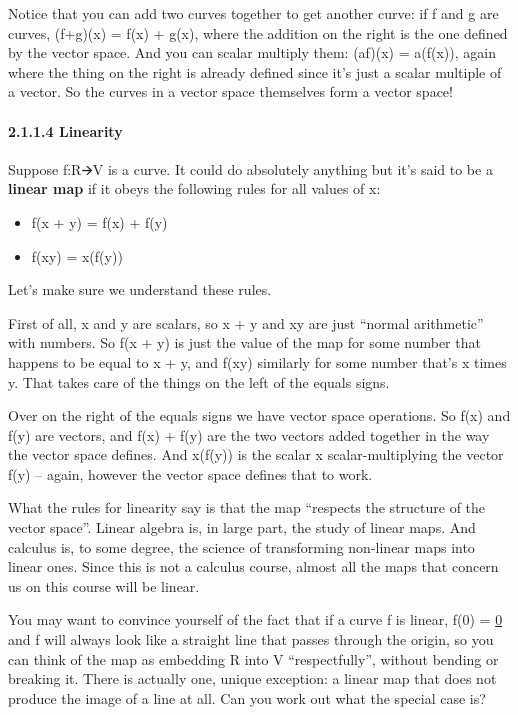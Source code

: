 \documentclass[oneside,english]{amsbook}
\numberwithin{section}{chapter}
\theoremstyle{plain}
\theoremstyle{definition}
\begin{document}
Notice that you can add two curves together to get another curve: if f
and g are curves, (f+g)(x) = f(x) + g(x), where the addition on the
right is the one defined by the vector space. And you can scalar
multiply them: (af)(x) = a(f(x)), again where the thing on the right is
already defined since it's just a scalar multiple of a vector. So the
curves in a vector space themselves form a vector space!

\paragraph{2.1.1.4 Linearity}\label{linearity}

Suppose f:R🡪V is a curve. It could do absolutely anything but it's said
to be a \textbf{linear map} if it obeys the following rules for all
values of x:

\begin{itemize}
	\item
	f(x + y) = f(x) + f(y)
	\item
	f(xy) = x(f(y))
\end{itemize}

Let's make sure we understand these rules.

First of all, x and y are scalars, so x + y and xy are just ``normal
arithmetic'' with numbers. So f(x + y) is just the value of the map for
some number that happens to be equal to x + y, and f(xy) similarly for
some number that's x times y. That takes care of the things on the left
of the equals signs.

Over on the right of the equals signs we have vector space operations.
So f(x) and f(y) are vectors, and f(x) + f(y) are the two vectors added
together in the way the vector space defines. And x(f(y)) is the scalar
x scalar-multiplying the vector f(y) -- again, however the vector space
defines that to work.

What the rules for linearity say is that the map ``respects the
structure of the vector space''. Linear algebra is, in large part, the
study of linear maps. And calculus is, to some degree, the science of
transforming non-linear maps into linear ones. Since this is not a
calculus course, almost all the maps that concern us on this course will
be linear.

You may want to convince yourself of the fact that if a curve f is
linear, f(0) = \ul{0} and f will always look like a straight line that
passes through the origin, so you can think of the map as embedding R
into V ``respectfully'', without bending or breaking it. There is
actually one, unique exception: a linear map that does not produce the
image of a line at all. Can you work out what the special case is?
\end{document}
